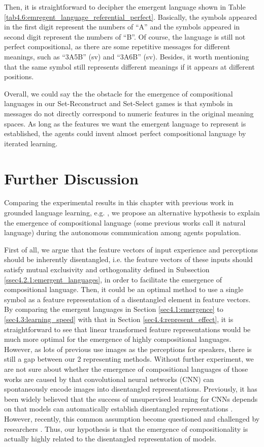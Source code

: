 Then, it is straightforward to decipher the emergent language shown in Table \ref{tab4.6:emregent_language_referential_perfect}. Basically, the symbols appeared in the first digit represent the numbers of ``A'' and the symbols appeared in second digit represent the numbers of ``B''. Of course, the language is still not perfect compositional, as there are some repetitive messages for different meanings, such as ``3A5B'' (sv) and ``3A6B'' (sv). Besides, it worth mentioning that the same symbol still represents different meanings if it appears at different positions.

Overall, we could say the the obstacle for the emergence of compositional languages in our Set-Reconstruct and Set-Select games is that symbols in messages do not directly correspond to numeric features in the original meaning spaces. As long as the features we want the emergent language to represent is established, the agents could invent almost perfect compositional language by iterated learning.

\section{Further Discussion}
\label{sec4.5:discuss}

Comparing the experimental results in this chapter with previous work in grounded language learning, e.g. \cite{kottur2017natural, hermann2017grounded, havrylov2017emergence, mordatch2018emergence}, we propose an alternative hypothesis to explain the emergence of compositional language (some previous works call it natural language) during the autonomous communication among agents population.

First of all, we argue that the feature vectors of input experience and perceptions should be inherently disentangled, i.e. the feature vectors of these inputs should satisfy mutual exclusivity and orthogonality defined in Subsection \ref{ssec4.2.1:emergent_languages}, in order to facilitate the emergence of compositional language. Then, it could be an optimal method to use a single symbol as a feature representation of a disentangled element in feature vectors. By comparing the emergent languages in Section \ref{sec4.1:emergence} to \ref{sec4.3:learning_speed} with that in Section \ref{sec4.4:represent_effect}, it is straightforward to see that linear transformed feature representations would be much more optimal for the emergence of highly compositional languages. However, as lots of previous use images as the perceptions for speakers, there is still a gap between our 2 representing methods. Without further experiment, we are not sure about whether the emergence of compositional languages of those works are caused by that convolutional neural networks (CNN) can spontaneously encode images into disentangled representations. Previously, it has been widely believed that the success of unsupervised learning for CNNs depends on that models can automatically establish disentangled representations \cite{bengio2013representation}. However, recently, this common assumption become questioned and challenged by researchers \cite{locatello2018challenging}. Thus, our hypothesis is that the emergence of compositionality is actually highly related to the disentangled representation of models.

